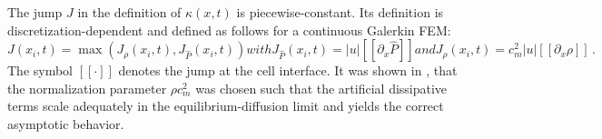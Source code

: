 \documentclass[times,doublespace]{fldauth}%
\begin{document}
The jump $J$ in the definition of $\kappa(x,t)$ is piecewise-constant. Its definition is discretization-dependent and defined as follows for a continuous Galerkin FEM: 
\begin{subequations}
\label{eq:equation12ter}
\begin{equation}
J(x_i,t) = \max( J_{\rho}(x_i,t), J_{\hat{P}}(x_i,t) )
\end{equation}
with
\begin{equation}
J_{\hat{P}}(x_i,t) = |u| [[\partial_x \hat{P}]]
\end{equation}
and
\begin{equation}
J_{\rho}(x_i,t) = c_m^2 |u|  [[\partial_x \rho]] \,.
\end{equation}
\end{subequations}
The symbol $[[ \cdot ]]$ denotes the jump at the cell interface. It was shown in \cite{our_jcp_radhy_paper}, that the normalization parameter $\rho c^2_m$ was chosen such that the artificial dissipative terms scale adequately in the equilibrium-diffusion limit and yields the correct asymptotic behavior. 
\end{document}
